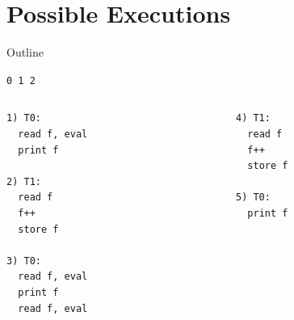 






\section{Possible Executions}

\begin{frame}{Outline}
  \tableofcontents[current]
\end{frame}

\begin{frame}[fragile]{\lstinline{0 1 2}}
  \begin{columns}[t]
    \begin{column}{0.5\textwidth}
  \begin{lstlisting}
1) T0:
  read f, eval 
  print f

2) T1: 
  read f
  f++
  store f

3) T0: 
  read f, eval
  print f
  read f, eval
  \end{lstlisting}
    \end{column}
    \begin{column}{0.5\textwidth}
  \begin{lstlisting}
4) T1:
  read f
  f++
  store f

5) T0:
  print f
  \end{lstlisting}
    \end{column}
  \end{columns}
\end{frame}

